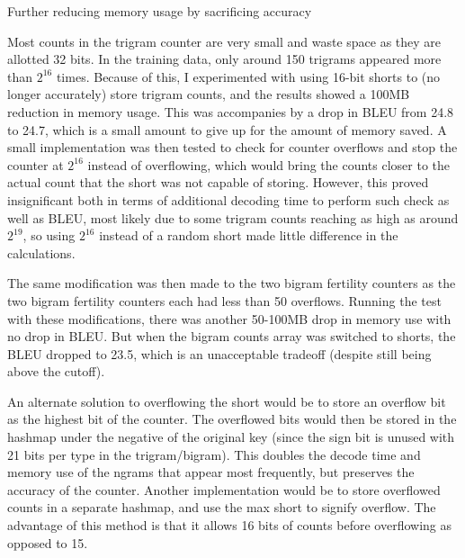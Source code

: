 

Further reducing memory usage by sacrificing accuracy

Most counts in the trigram counter are very small and waste space as they are allotted 32 bits. In the training data, only around 150 trigrams appeared more than $2^16$ times. Because of this, I experimented with using 16-bit shorts to (no longer accurately) store trigram counts, and the results showed a 100MB reduction in memory usage. This was accompanies by a drop in BLEU from 24.8 to 24.7, which is a small amount to give up for the amount of memory saved. A small implementation was then tested to check for counter overflows and stop the counter at $2^16$ instead of overflowing, which would bring the counts closer to the actual count that the short was not capable of storing. However, this proved insignificant both in terms of additional decoding time to perform such check as well as BLEU, most likely due to some trigram counts reaching as high as around $2^19$, so using $2^16$ instead of a random short made little difference in the calculations.

The same modification was then made to the two bigram fertility counters as the two bigram fertility counters each had less than 50 overflows. Running the test with these modifications, there was another 50-100MB drop in memory use with no drop in BLEU. But when the bigram counts array was switched to shorts, the BLEU dropped to 23.5, which is an unacceptable tradeoff (despite still being above the cutoff).

An alternate solution to overflowing the short would be to store an overflow bit as the highest bit of the counter. The overflowed bits would then be stored in the hashmap under the negative of the original key (since the sign bit is unused with 21 bits per type in the trigram/bigram). This doubles the decode time and memory use of the ngrams that appear most frequently, but preserves the accuracy of the counter. Another implementation would be to store overflowed counts in a separate hashmap, and use the max short to signify overflow. The advantage of this method is that it allows 16 bits of counts before overflowing as opposed to 15.

